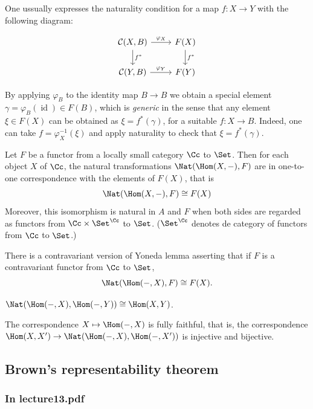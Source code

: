 \begin{remark}
\begin{defn}
\begin{defn}
	One ussually expresses the naturality condition for a map $f:X\to Y$ with the following diagram:

	\[\begin{tikzcd}
		\mathcal{C}(X,B)\arrow[r,"\varphi_{X}"]\arrow[d,"f^{*}"]&F(X)\arrow[d,"f^{*}"]\\
		\mathcal{C}(Y,B)\arrow[r,"\varphi_{Y}"]&F(Y)
	\end{tikzcd}\]
\end{defn}

\begin{remark}
	By applying $\varphi_{B}$ to the identity map  $B\to B$ we obtain a special element $\gamma=\varphi_{B}(\operatorname{id})\in F(B)$, which is \textit{generic} in the sense that any element $\xi \in F(X)$ can be obtained as $\xi=f^{*} (\gamma)$, for a suitable $f:X\to B$. Indeed, one can take $f=\varphi^{-1}_{X}(\xi)$ and apply naturality to check that $\xi=f^{*}(\gamma)$. 
\end{remark}


\begin{lemma}
	Let $F$ be a functor from a locally small category $\Cc$ to $\Set$. Then for each object $X$ of $\Cc$, the natural transformations $\Nat(\Hom(X,-),F)$ are in one-to-one correspondence with the elements of $F(X)$, that is
	\[\Nat(\Hom(X,-), F)\cong F(X)\]
	Moreover, this isomorphism is natural in $A$ and $F$ when both sides are regarded as functors from $\Cc\times\Set^{\Cc}$ to $\Set$. ($\Set^{\Cc}$ denotes de category of functors from $\Cc$ to $\Set$.)
	
	There is a contravariant version of Yoneda lemma asserting that if $F$ is a contravariant functor from $\Cc$ to $\Set$,
	\[\Nat(\Hom(-,X), F)\cong F(X).\]
\end{lemma}
\begin{coro}
	$\Nat (\Hom(-,X),\Hom(-,Y))\cong\Hom(X,Y)$.
\end{coro}
\begin{remark}
	The correspondence $X\mapsto\Hom(-,X)$ is fully faithful, that is, the correspondence $\Hom(X,X')\to\Nat(\Hom(-,X),\Hom(-,X'))$ is injective and bijective.
\end{remark}

\subsection{Brown's representability theorem}

\subsubsection{In lecture13.pdf}


\end{defn}
\end{remark}
